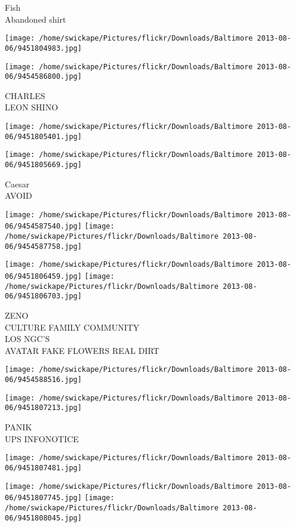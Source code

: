 \documentclass[10pt,letterpaper]{article}
\begin{document}
Fish\\
Abandoned shirt
\pagebreak

\texttt{[image: /home/swickape/Pictures/flickr/Downloads/Baltimore 2013-08-06/9451804983.jpg]}

\vspace{0.25in}
\texttt{[image: /home/swickape/Pictures/flickr/Downloads/Baltimore 2013-08-06/9454586800.jpg]}

CHARLES\\
LEON SHINO
\pagebreak

\texttt{[image: /home/swickape/Pictures/flickr/Downloads/Baltimore 2013-08-06/9451805401.jpg]}

\vspace{0.25in}
\texttt{[image: /home/swickape/Pictures/flickr/Downloads/Baltimore 2013-08-06/9451805669.jpg]}

Caesar\\
AVOID
\pagebreak

\texttt{[image: /home/swickape/Pictures/flickr/Downloads/Baltimore 2013-08-06/9454587540.jpg]}
\texttt{[image: /home/swickape/Pictures/flickr/Downloads/Baltimore 2013-08-06/9454587758.jpg]}

\texttt{[image: /home/swickape/Pictures/flickr/Downloads/Baltimore 2013-08-06/9451806459.jpg]}
\texttt{[image: /home/swickape/Pictures/flickr/Downloads/Baltimore 2013-08-06/9451806703.jpg]}

ZENO\\
CULTURE FAMILY COMMUNITY\\
LOS NGC'S\\
AVATAR FAKE FLOWERS REAL DIRT
\pagebreak

\texttt{[image: /home/swickape/Pictures/flickr/Downloads/Baltimore 2013-08-06/9454588516.jpg]}

\vspace{0.25in}
\texttt{[image: /home/swickape/Pictures/flickr/Downloads/Baltimore 2013-08-06/9451807213.jpg]}

PANIK\\
UPS INFONOTICE
\pagebreak

\texttt{[image: /home/swickape/Pictures/flickr/Downloads/Baltimore 2013-08-06/9451807481.jpg]}

\vspace{0.25in}
\texttt{[image: /home/swickape/Pictures/flickr/Downloads/Baltimore 2013-08-06/9451807745.jpg]}
\texttt{[image: /home/swickape/Pictures/flickr/Downloads/Baltimore 2013-08-06/9451808045.jpg]}
\end{document}
